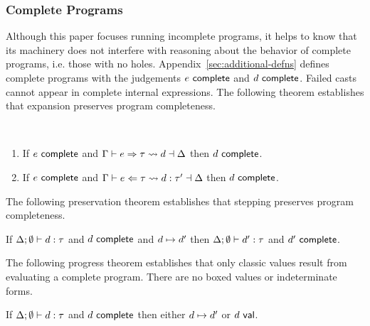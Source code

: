
\subsubsection{Complete Programs} 
%
Although this paper focuses running incomplete programs, it helps
to know that its machinery does not interfere
with reasoning about the behavior of complete programs, i.e. those
with no holes.
%
Appendix~\ref{sec:additional-defns} defines complete programs with the judgements $e~\mathsf{complete}$ and $d~\mathsf{complete}$. 
Failed casts cannot appear in complete internal expressions. 
The following theorem establishes that expansion preserves program completeness.
\begin{thm} ~
  \begin{enumerate}[nolistsep]
    \item
      If $e~\mathsf{complete}$
      and $\Gamma \vdash e \Rightarrow \tau \leadsto d \dashv \Delta$
      then $d~\mathsf{complete}$.
    \item
      If $e~\mathsf{complete}$
      and $\Gamma \vdash e \Leftarrow \tau \leadsto d : \tau' \dashv \Delta$
      then $d~\mathsf{complete}$.
  \end{enumerate}
\end{thm}

The following preservation theorem establishes that stepping preserves program completeness.
\begin{thm}
  If $\Delta; \emptyset \vdash d : \tau$
  and $d~\mathsf{complete}$
  and $d \mapsto d'$
  then $\Delta; \emptyset \vdash d' : \tau$
  and $d'~\mathsf{complete}$.
\end{thm}

The following progress theorem establishes that only classic values result from evaluating a complete program. There are no boxed values or indeterminate forms. 
\begin{thm}
  If $\Delta; \emptyset \vdash d : \tau$
  and $d~\mathsf{complete}$
  then either $d \mapsto d'$
  or $d~\mathsf{val}$.
\end{thm}



